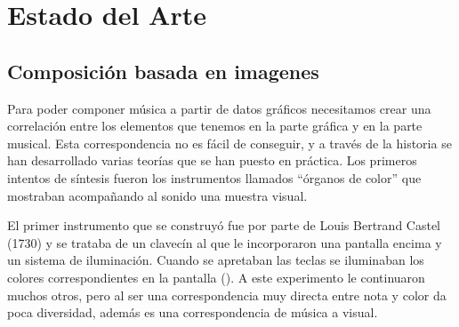 \section{Estado del Arte}
\label{sec:estadodelarte}




\subsection{Composición basada en imagenes}


Para poder componer música a partir de datos gráficos necesitamos crear una correlación entre los elementos que tenemos en la parte gráfica y en la parte musical. Esta correspondencia no es fácil de conseguir, y a través de la historia se han desarrollado varias teorías que se han puesto en práctica. Los primeros intentos de síntesis fueron los instrumentos llamados ``órganos de color'' que mostraban acompañando al sonido una muestra visual.

El primer instrumento que se construyó fue por parte de Louis Bertrand Castel (1730) y se trataba de un clavecín al que le incorporaron una pantalla encima y un sistema de iluminación. Cuando se apretaban las teclas se iluminaban los colores correspondientes en la pantalla (\cite{organosColor}). A este experimento le continuaron muchos otros, pero al ser una correspondencia muy directa entre nota y color da poca diversidad, además es una correspondencia de música a visual.\\

